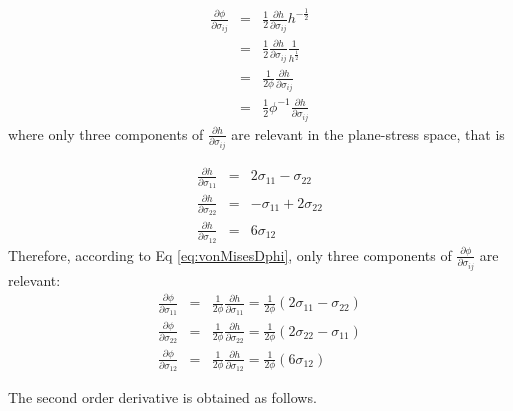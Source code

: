 \documentclass[12pt]{amsart}
\begin{document}
\begin{eqnarray}
  \label{eq:vonMisesDphi}
  \frac{\partial \phi}{\partial\sigma_{ij}}&=& \frac{1}{2}\frac{\partial h}{\partial \sigma_{ij}} h^{-\frac{1}{2}}\\
                                          &=&\frac{1}{2}\frac{\partial h}{\partial \sigma_{ij}} \frac{1}{h^\frac{1}{2}}\\
                                          &=&\frac{1}{2\phi}\frac{\partial h}{\partial \sigma_{ij}}\\
                                          &=&\frac{1}{2}\phi^{-1} \frac{\partial h}{\partial \sigma_{ij}}
\end{eqnarray}
where only three components of $\frac{\partial h}{\partial \sigma_{ij}}$ are relevant in the plane-stress space, that is

\begin{eqnarray}
  \label{eq:dh}
  \frac{\partial h}{\partial \sigma_{11}}&=&2\sigma_{11}-\sigma_{22} \\
  \frac{\partial h}{\partial \sigma_{22}}&=&-\sigma_{11}+2\sigma_{22}\\
  \frac{\partial h}{\partial \sigma_{12}}&=&6\sigma_{12}
\end{eqnarray}
Therefore, according to Eq \ref{eq:vonMisesDphi}, only three components of $\frac{\partial \phi}{\partial\sigma_{ij}}$ are relevant:
\begin{eqnarray}
  \label{eq:vonMisesDphi}
  \frac{\partial \phi}{\partial\sigma_{11}}&=&\frac{1}{2\phi}\frac{\partial h}{\partial \sigma_{11}}=\frac{1}{2\phi} (2\sigma_{11}-\sigma_{22})\\
  \frac{\partial \phi}{\partial\sigma_{22}}&=&\frac{1}{2\phi}\frac{\partial h}{\partial \sigma_{22}}=\frac{1}{2\phi} (2\sigma_{22}-\sigma_{11})\\
  \frac{\partial \phi}{\partial\sigma_{12}}&=&\frac{1}{2\phi}\frac{\partial h}{\partial \sigma_{12}}=\frac{1}{2\phi} (6\sigma_{12})
\end{eqnarray}

The second order derivative is obtained as follows.
\end{document}
